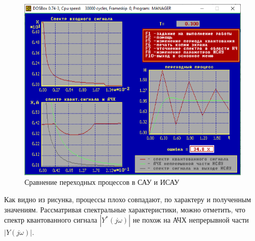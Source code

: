 	\begin{figure}[h]
		\centering\includegraphics[width=.6\textwidth]{png/graph1.png}
		\caption{Сравнение переходных процессов в САУ и ИСАУ}
		\label{tipoSau1}
	\end{figure}
	
	Как видно из рисунка, процессы плохо совпадают, по характеру и полученным значениям. Рассматривая спектральные характеристики, можно отметить, что спектр квантованного сигнала $\left|Y^* (j\omega)\right|$ не похож на АЧХ непрерывной части $\left|Y(j\omega)\right|$.
	
